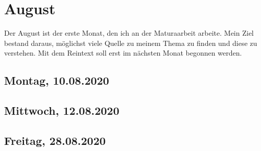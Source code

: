 \documentclass[../main.tex]{subfiles}
\begin{document}
	\section{August}
	Der August ist der erste Monat, den ich an der Maturaarbeit arbeite.
	Mein Ziel bestand daraus, möglichst viele Quelle zu meinem Thema zu finden und diese zu verstehen.
	Mit dem Reintext soll erst im nächsten Monat begonnen werden.
	
	\subsection{Montag, 10.08.2020}
		
	
	
	\subsection{Mittwoch, 12.08.2020}
	
	
	
	
	\subsection{Freitag, 28.08.2020}
	
	
\end{document}
